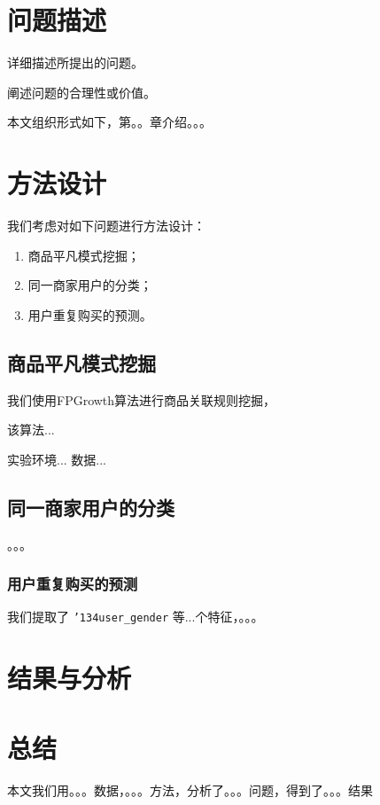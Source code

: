 \documentclass{acm_proc_article-sp}
\newcommand{\zap}[1]{}
\begin{document}
\begin{spacing}{1.2}
\zap{
\category{H.4}{Information Systems Applications}{Miscellaneous}
\category{D.2.8}{Software Engineering}{Metrics}[complexity measures, performance measures]
}



\section{问题描述} %
详细描述所提出的问题。

阐述问题的合理性或价值。

本文组织形式如下，第。。章介绍。。。

\section{方法设计}
我们考虑对如下问题进行方法设计：
\begin{enumerate}
  \item 商品平凡模式挖掘；
  \item 同一商家用户的分类；
  \item 用户重复购买的预测。
\end{enumerate}

\subsection{商品平凡模式挖掘}
我们使用FPGrowth算法进行商品关联规则挖掘，

该算法...

实验环境...
数据...

\subsection{同一商家用户的分类}
。。。

\subsubsection{用户重复购买的预测}
我们提取了 \texttt{{\char'134}user\_gender} 等...个特征，。。。

\section{结果与分析}

\section{总结}
本文我们用。。。数据，。。。方法，分析了。。。问题，得到了。。。结果


\end{spacing}
\end{document}
